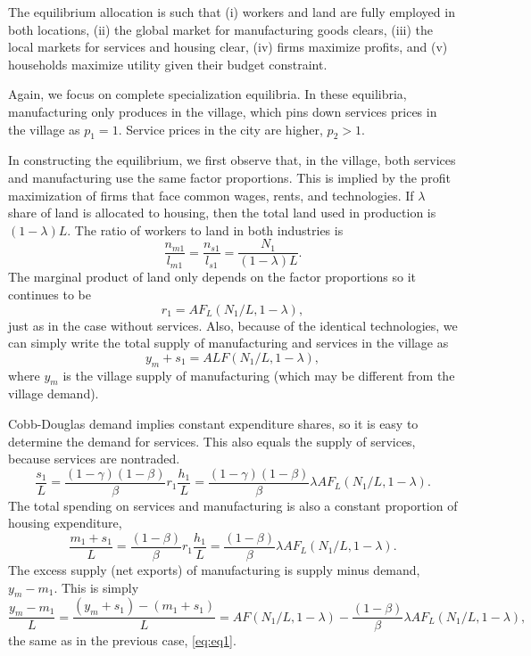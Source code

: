 \documentclass[12pt]{article}
\begin{document}
The equilibrium allocation is such that (i) workers and land are fully employed in both locations, (ii) the global market for manufacturing goods clears, (iii) the local markets for services and housing clear, (iv) firms maximize profits, and (v) households maximize utility given their budget constraint.

Again, we focus on complete specialization equilibria. In these equilibria, manufacturing only produces in the village, which pins down services prices in the village as $p_1=1$. Service prices in the city are higher, $p_2>1$.

In constructing the equilibrium, we first observe that, in the village, both services and manufacturing use the same factor proportions. This is implied by the profit maximization of firms that face common wages, rents, and technologies. If ${\lambda}$ share of land is allocated to housing, then the total land used in production is $(1-{\lambda})L$. The ratio of workers to land in both industries is
\[
\frac{n_{m1}}{l_{m1}}=\frac{n_{s1}}{l_{s1}}=\frac{N_1}{(1-{\lambda})L}.
\]
The marginal product of land only depends on the factor proportions so it continues to be
\[
r_1 = AF_L(N_1/L,1-{\lambda}),
\]
just as in the case without services. Also, because of the identical technologies, we can simply write the total supply of manufacturing and services in the village as
\[
y_{m}+s_1 = ALF(N_1/L,1-{\lambda}),
\]
where $y_{m}$ is the village supply of manufacturing (which may be different from the village demand).

Cobb-Douglas demand implies constant expenditure shares, so it is easy to determine the demand for services. This also equals the supply of services, because services are nontraded.
\[
\frac{s_1}{L}  = \frac{(1-\gamma)(1-\beta)}{\beta} r_1\frac{h_1}{L} = \frac{(1-\gamma)(1-\beta)}{\beta}{\lambda}AF_L(N_1/L,1-{\lambda}).
\]
The total spending on services and manufacturing is also a constant proportion of housing expenditure,
\[
\frac{m_1+s_1}{L}  = \frac{(1-\beta)}{\beta} r_1\frac{h_1}{L} = \frac{(1-\beta)}{\beta}{\lambda}AF_L(N_1/L,1-{\lambda}).
\]
The excess supply (net exports) of manufacturing is supply minus demand, $y_m-m_1$. This is simply
\begin{equation}\label{eq:eq1b}
\frac{y_m-m_1}{L} = \frac{(y_m+s_1)-(m_1+s_1)}{L} = AF(N_1/L,1-{\lambda}) - \frac{(1-\beta)}{\beta}{\lambda}AF_L(N_1/L,1-{\lambda}),
\end{equation}
the same as in the previous case, \eqref{eq:eq1}.
\end{document}
